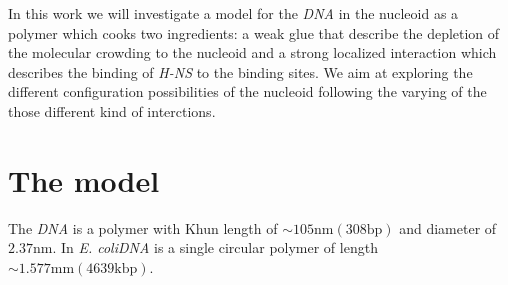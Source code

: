 \documentclass[12pt,a4paper,notitlepage]{article}
\newcommand{\hns}{\emph{H-NS}\xspace}
\newcommand{\ecoli}{\emph{E. coli}\xspace}
\newcommand{\dna}{\emph{DNA}\xspace}
\begin{document}
In this work we will investigate a model for the \dna in the nucleoid
as a polymer which cooks two ingredients:
a weak glue that describe the depletion of the molecular crowding to
the nucleoid and a strong localized interaction which describes the
binding of \hns to the binding sites. We aim at exploring the
different configuration possibilities of the nucleoid following the
varying of the those different kind of interctions.

\section{The model}
\label{sec:themodel}

The \dna is a polymer with Khun length of $\sim 105 \mathrm{nm} (308
\mathrm{bp})$ and diameter of $2.37 \mathrm{nm}$. In \ecoli \dna is a
single circular polymer of length $\sim 1.577 \mathrm{mm} (4639
\mathrm{kbp})$.
\end{document}
